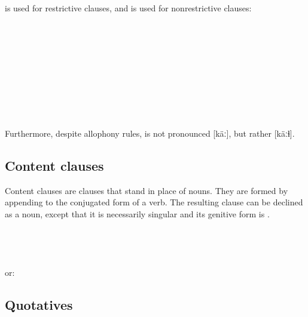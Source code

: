\documentclass{book}
\begin{document}
 is used for restrictive clauses, and  is used for nonrestrictive clauses: \\
~\\
   \\
   \\
\emph{   } \\
~\\
   \\
   \\
\emph{  } \\
~

Furthermore, despite allophony rules,  is not pronounced [käː], but rather [käːɬ].

\subsection{Content clauses}

Content clauses are clauses that stand in place of nouns. They are formed by appending  to the conjugated form of a verb. The resulting clause can be declined as a noun, except that it is necessarily singular and its genitive form is . \\
~\\
   \\
   \\
\emph{   } \\
or: \emph{   }

\subsection{Quotatives}
\end{document}
